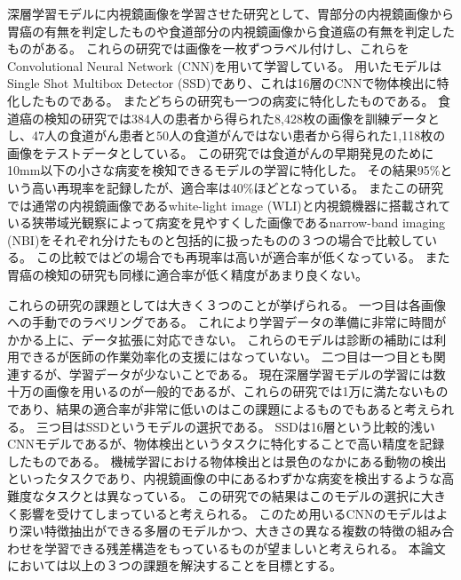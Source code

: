 深層学習モデルに内視鏡画像を学習させた研究として、胃部分の内視鏡画像から胃癌の有無を判定したもの\cite{stomach_cancer}や食道部分の内視鏡画像から食道癌の有無を判定したもの\cite{stomach_cancer}がある。
これらの研究では画像を一枚ずつラベル付けし、これらをConvolutional Neural Network (CNN)\cite{CNN}を用いて学習している。
用いたモデルはSingle Shot Multibox Detector (SSD)\cite{SSD}であり、これは16層のCNNで物体検出に特化したものである。
またどちらの研究も一つの病変に特化したものである。
食道癌の検知の研究では384人の患者から得られた8,428枚の画像を訓練データとし、47人の食道がん患者と50人の食道がんではない患者から得られた1,118枚の画像をテストデータとしている。
この研究では食道がんの早期発見のために10mm以下の小さな病変を検知できるモデルの学習に特化した。
その結果95\%という高い再現率を記録したが、適合率は40\%ほどとなっている。
またこの研究では通常の内視鏡画像であるwhite-light image (WLI)と内視鏡機器に搭載されている狭帯域光観察によって病変を見やすくした画像であるnarrow-band imaging (NBI)をそれぞれ分けたものと包括的に扱ったものの３つの場合で比較している。
この比較ではどの場合でも再現率は高いが適合率が低くなっている。
また胃癌の検知の研究も同様に適合率が低く精度があまり良くない。

これらの研究の課題としては大きく３つのことが挙げられる。
一つ目は各画像への手動でのラベリングである。
これにより学習データの準備に非常に時間がかかる上に、データ拡張に対応できない。
これらのモデルは診断の補助には利用できるが医師の作業効率化の支援にはなっていない。
二つ目は一つ目とも関連するが、学習データが少ないことである。
現在深層学習モデルの学習には数十万の画像を用いるのが一般的であるが、これらの研究では1万に満たないものであり、結果の適合率が非常に低いのはこの課題によるものでもあると考えられる。
三つ目はSSDというモデルの選択である。
SSDは16層という比較的浅いCNNモデルであるが、物体検出というタスクに特化することで高い精度を記録したものである。
機械学習における物体検出とは景色のなかにある動物の検出といったタスクであり、内視鏡画像の中にあるわずかな病変を検出するような高難度なタスクとは異なっている。
この研究での結果はこのモデルの選択に大きく影響を受けてしまっていると考えられる。
このため用いるCNNのモデルはより深い特徴抽出ができる多層のモデルかつ、大きさの異なる複数の特徴の組み合わせを学習できる残差構造をもっているものが望ましいと考えられる。
本論文においては以上の３つの課題を解決することを目標とする。

